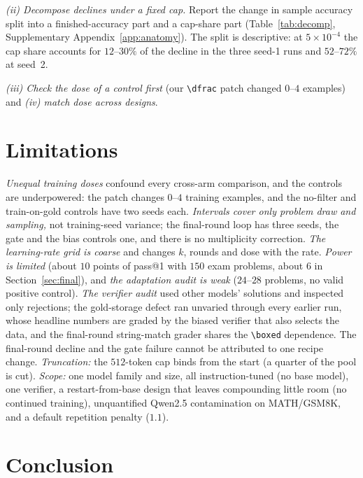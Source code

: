 \documentclass[runningheads]{llncs}
\begin{document}
\emph{(ii) Decompose declines under a fixed cap.} Report the change in sample
accuracy split into a finished-accuracy part and a cap-share part
(Table~\ref{tab:decomp}, Supplementary Appendix~\ref{app:anatomy}). The split is descriptive: at $5\times10^{-4}$ the cap share accounts for
$12$--$30\%$ of the decline in the three seed-1 runs and $52$--$72\%$
at seed~2.

\emph{(iii) Check the dose of a control first} (our \verb|\dfrac| patch changed $0$--$4$ examples) and \emph{(iv) match dose across designs}.

\section{Limitations}
\label{sec:limitations}

\emph{Unequal training doses} confound every cross-arm comparison, and the
controls are underpowered: the patch changes $0$--$4$ training examples, and
the no-filter and train-on-gold controls have two seeds each. \emph{Intervals
cover only problem draw and sampling,} not training-seed variance; the final-round loop has three seeds, the
gate and the bias controls one, and there is no multiplicity correction. \emph{The
learning-rate grid is coarse} and changes $k$, rounds and dose with the rate. \emph{Power is limited} (about $10$ points of pass@1 with $150$ exam
problems, about $6$ in Section~\ref{sec:final}), and \emph{the adaptation audit is weak} ($24$--$28$
problems, no valid positive control).
 \emph{The verifier audit} used other models' solutions and inspected only
rejections; the gold-storage defect ran unvaried through every earlier run, whose headline numbers are graded
by the biased verifier that also selects the data, and the final-round string-match grader shares the \verb|\boxed| dependence. The final-round decline and the gate failure cannot be attributed to one recipe change. \emph{Truncation:} the $512$-token cap binds from
the start (a quarter of the pool is cut). \emph{Scope:}
one model family and size, all instruction-tuned (no base model), one verifier, a
restart-from-base design that leaves compounding little room (no continued
training), unquantified Qwen2.5 contamination on MATH/GSM8K, and a default repetition penalty ($1.1$).

\section{Conclusion}
\label{sec:conclusion}
\end{document}
